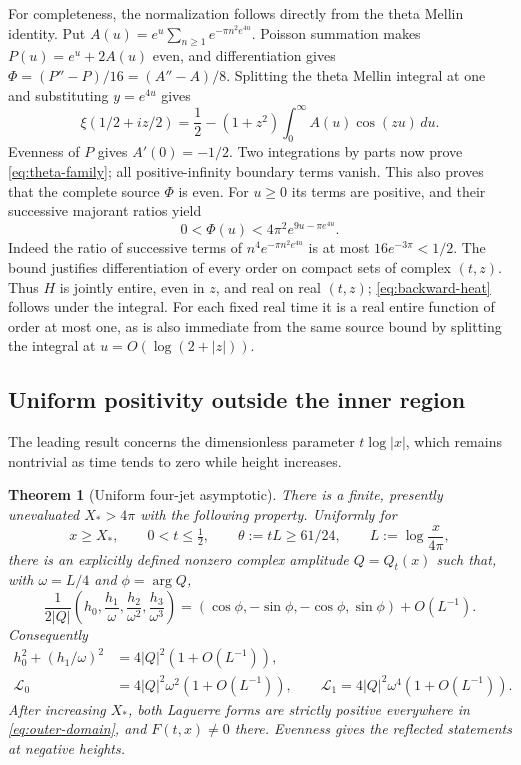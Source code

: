 \documentclass[11pt]{article}
\numberwithin{equation}{section}
\newtheorem{theorem}{Theorem}[section]
\theoremstyle{definition}
\theoremstyle{remark}
\newcommand{\dd}{\,d}
\newcommand{\Lag}{\mathcal L}
\begin{document}
For completeness, the normalization follows directly from the theta
Mellin identity. Put $A(u)=e^u\sum_{n\ge1}e^{-\pi n^2e^{4u}}$.
Poisson summation makes $P(u)=e^u+2A(u)$ even, and differentiation gives
$\Phi=(P''-P)/16=(A''-A)/8$. Splitting the theta Mellin integral at one
and substituting $y=e^{4u}$ gives
\[
 \xi(1/2+iz/2)=\frac12-(1+z^2)
                    \int_0^\infty A(u)\cos(zu)\dd u.
\]
Evenness of $P$ gives $A'(0)=-1/2$. Two integrations by parts now prove
\eqref{eq:theta-family}; all positive-infinity boundary terms vanish.
This also proves that the complete source $\Phi$ is even. For $u\ge0$
its terms are positive, and their successive majorant ratios yield
\begin{equation}
 0<\Phi(u)<4\pi^2e^{9u-\pi e^{4u}}.
 \label{eq:source-majorant}
\end{equation}
Indeed the ratio of successive terms of $n^4e^{-\pi n^2e^{4u}}$ is at
most $16e^{-3\pi}<1/2$. The bound justifies differentiation of every
order on compact sets of complex $(t,z)$. Thus $H$ is jointly entire,
even in $z$, and real on real $(t,z)$; \eqref{eq:backward-heat} follows
under the integral. For each fixed real time it is a real entire
function of order at most one, as is also immediate from the same
source bound by splitting the integral at $u=O(\log(2+|z|))$.

\subsection{Uniform positivity outside the inner region}
The leading result concerns the dimensionless parameter $t\log|x|$,
which remains nontrivial as time tends to zero while height increases.
\begin{theorem}[Uniform four-jet asymptotic]\label{thm:outer}
There is a finite, presently unevaluated $X_*>4\pi$ with the
following property. Uniformly for
\begin{equation}
 x\ge X_*,\qquad 0<t\le\tfrac12,\qquad
 \theta:=tL\ge61/24,\qquad L:=\log\frac{x}{4\pi},
 \label{eq:outer-domain}
\end{equation}
there is an explicitly defined nonzero complex amplitude $Q=Q_t(x)$
such that, with $\omega=L/4$ and $\phi=\arg Q$,
\begin{equation}
 \frac{1}{2|Q|}\left(h_0,\frac{h_1}{\omega},
                   \frac{h_2}{\omega^2},\frac{h_3}{\omega^3}\right)
 = (\cos\phi,-\sin\phi,-\cos\phi,\sin\phi)
       +O(L^{-1}).
 \label{eq:main-four-jet}
\end{equation}
Consequently
\begin{align}
 h_0^2+(h_1/\omega)^2&=4|Q|^2(1+O(L^{-1})),
 \label{eq:main-balanced}\\
 \Lag_0&=4|Q|^2\omega^2(1+O(L^{-1})),\qquad
 \Lag_1=4|Q|^2\omega^4(1+O(L^{-1})).
 \label{eq:main-signs}
\end{align}
After increasing $X_*$, both Laguerre forms are strictly
positive everywhere in \eqref{eq:outer-domain}, and $F(t,x)\ne0$ there.
Evenness gives the reflected statements at negative heights.
\end{theorem}
\end{document}
